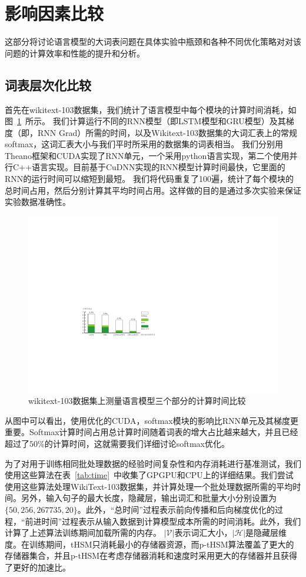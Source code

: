 \section{影响因素比较}
这部分将讨论语言模型的大词表问题在具体实验中瓶颈和各种不同优化策略对对该问题的计算效率和性能的提升和分析。
\subsection{词表层次化比较}
首先在wikitext-103数据集，我们统计了语言模型中每个模块的计算时间消耗，如图~\ref{fig:rnn_timing}~所示。 我们计算运行不同的RNN模型（即LSTM模型和GRU模型）及其梯度（即，RNN Grad）所需的时间，以及Wikitext-103数据集的大词汇表上的常规softmax，这词汇表大小与我们平时所采用的数据集的词表相当。 我们分别用Theano框架和CUDA实现了RNN单元，一个采用python语言实现，第二个使用并行C++语言实现。目前基于CuDNN实现的RNN模型计算时间最快，它里面的RNN的运行时间可以缩短到最短。 我们将代码重复了100遍，统计了每个模块的总时间占用，然后分别计算其平均时间占用。这样做的目的是通过多次实验来保证实验数据准确性。
\begin{figure}[!t]
  \centering
  \includegraphics[width=.9\columnwidth]{./figures/rnn_timing.pdf}
  \caption{wikitext-103数据集上测量语言模型三个部分的计算时间比较}\label{fig:rnn_timing}
\end{figure}


从图中可以看出，使用优化的CUDA，softmax模块的影响比RNN单元及其梯度更重要。Softmax计算时间占用总计算时间随着词表的增大占比越来越大，并且已经超过了$50\%$的计算时间，这就需要我们详细讨论softmax优化。

为了对用于训练相同批处理数据的经验时间复杂性和内存消耗进行基准测试，我们使用这些算法在表~\ref{tab:time}~中收集了GPGPU和CPU上的详细结果。我们尝试使用这些算法处理WikiText-103数据集，并计算处理一个批处理数据所需的平均时间。另外，输入句子的最大长度，隐藏层，输出词汇和批量大小分别设置为$\{50, 256, 267735, 20\}$。此外，“总时间”过程表示前向传播和后向梯度优化的过程，“前进时间”过程表示从输入数据到计算模型成本所需的时间消耗。此外，我们计算了上述算法训练期间加载所需的内存。 $\mathcal{|V|} $表示词汇大小，$\mathcal{|H|} $是隐藏层维度。在训练期间，tHSM只消耗最小的存储器资源，而p-tHSM算法覆盖了更大的存储器集合，并且p-tHSM在考虑存储器消耗和速度时采用更大的存储器并且获得了更好的加速比。

